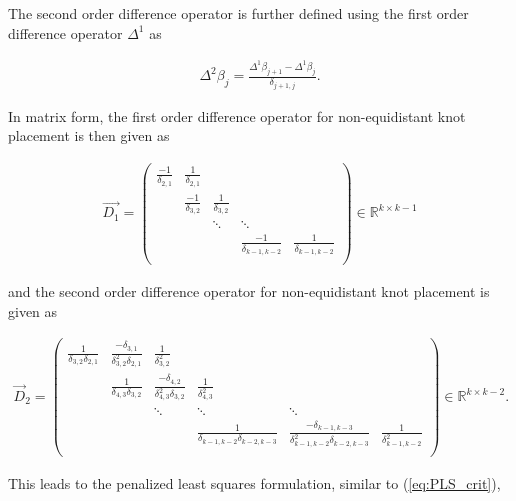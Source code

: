 \documentclass[10pt,a4paper]{report}
\begin{document}
The second order difference operator is further defined using the first order difference operator $\Delta^1$ as 

\begin{align} \label{eq:d2-operator-nonequidistant}
	\Delta^2 \beta_j = \frac{\Delta^1 \beta_{j+1} - \Delta^1 \beta_j}{\delta_{j+1,j}}.
\end{align}

In matrix form, the first order difference operator for non-equidistant knot placement is then given as

\begin{align} \label{eq:d1-matrix-nonequidistant}
	\vec{D_1} = \begin{pmatrix}
					\frac{-1}{\delta_{2,1}} & \frac{1}{\delta_{2,1}} &                         &  \\
										   & \frac{-1}{\delta_{3,2}} & \frac{1}{\delta_{3,2}} & \\
										   & 				        & 	\ddots                 & \ddots \\
										   &                        &                         & \frac{-1}{\delta_{k-1, k-2}} & \frac{1}{\delta_{k-1, k-2}} \\ 
	\end{pmatrix} \in \mathbb{R}^{k \times k-1}
\end{align} 

and the second order difference operator for non-equidistant knot placement is given as

\begin{align} \label{eq:d2-matrix-nonequidistant}
	\vec{D}_2 = \begin{pmatrix}
\frac{1}{\delta_{3,2} \delta_{2,1}} & \frac{- \delta_{3,1}}{\delta_{3,2}^2 \delta_{2,1}} & \frac{1}{\delta_{3,2}^2}  &  \\
									& \frac{1}{\delta_{4,3} \delta_{3,2}} & \frac{- \delta_{4,2}}{\delta_{4,3}^2 \delta_{3,2}} & \frac{1}{\delta_{4,3}^2} \\
									&       & 	\ddots    & \ddots & \ddots \\
		&    &  & \frac{1}{\delta_{k-1, k-2} \delta_{k-2, k-3}} & \frac{-\delta_{k-1, k-3}}{\delta_{k-1, k-2}^2 \delta_{k-2, k-3}} & \frac{1}{\delta_{k-1, k-2}^2} \\ 
	\end{pmatrix} \in \mathbb{R}^{k \times k-2}.
\end{align}


This leads to the penalized least squares formulation, similar to (\ref{eq:PLS_crit}),
\end{document}
